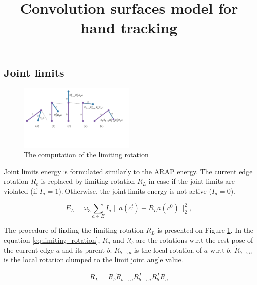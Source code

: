 \documentclass[tog]{acmsiggraph}
\title{Convolution surfaces model  for hand tracking}
\author{}
\begin{document}
\maketitle







\subsection{Joint limits}


\begin{figure}[h!] 
	\centering
	\hspace{0em}
	\includegraphics[trim = 0mm 70mm 0mm 0mm, width=0.5\textwidth]{fig/joint_limits}
	\caption{The computation of the limiting rotation}
	\label{fig:limiting_rotation}
\end{figure}

Joint limits energy is formulated similarly to the ARAP energy. The current edge rotation $R_e$ is replaced by limiting rotation $R_L$ in case if the joint limits are violated (if $I_a = 1$). Otherwise, the joint limits energy is not active ($I_a = 0$).

\begin{equation}
	E_{L} = \omega_3 \sum_{a \in E} I_a \| a(c^t) - R_L a(c^0)\|_2^2,
\end{equation}

The procedure of finding the limiting rotation $R_L$ is presented on Figure \ref{fig:limiting_rotation}. In the equation \ref{eq:limiting_rotation}, $R_a$ and $R_b$ are the rotations w.r.t the rest pose of the current edge $a$ and its parent $b$. $R_{b\rightarrow a}$ is the local rotation of $a$ w.r.t $b$. $\tilde{R}_{b\rightarrow a} $ is the local rotation clumped to the limit joint angle value.
 
\begin{equation}
	R_L = R_b \tilde{R}_{b\rightarrow a} R^T_{b\rightarrow a} R^T_b R_a \label{eq:limiting_rotation}
\end{equation}
\end{document}
